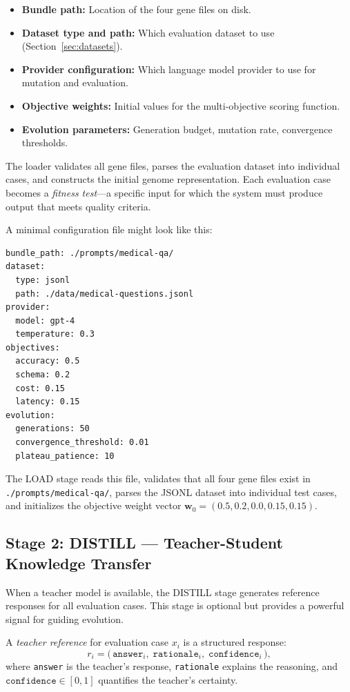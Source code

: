\begin{itemize}[leftmargin=1.5em]
  \item \textbf{Bundle path:} Location of the four gene files on disk.
  \item \textbf{Dataset type and path:} Which evaluation dataset to use (Section~\ref{sec:datasets}).
  \item \textbf{Provider configuration:} Which language model provider to use for mutation and evaluation.
  \item \textbf{Objective weights:} Initial values for the multi-objective scoring function.
  \item \textbf{Evolution parameters:} Generation budget, mutation rate, convergence thresholds.
\end{itemize}

The loader validates all gene files, parses the evaluation dataset into individual cases, and constructs the initial genome representation. Each evaluation case becomes a \emph{fitness test}---a specific input for which the system must produce output that meets quality criteria.

\begin{example}
A minimal configuration file might look like this:
\begin{verbatim}
bundle_path: ./prompts/medical-qa/
dataset:
  type: jsonl
  path: ./data/medical-questions.jsonl
provider:
  model: gpt-4
  temperature: 0.3
objectives:
  accuracy: 0.5
  schema: 0.2
  cost: 0.15
  latency: 0.15
evolution:
  generations: 50
  convergence_threshold: 0.01
  plateau_patience: 10
\end{verbatim}
The LOAD stage reads this file, validates that all four gene files exist in \texttt{./prompts/medical-qa/}, parses the JSONL dataset into individual test cases, and initializes the objective weight vector $\mathbf{w}_0 = (0.5, 0.2, 0.0, 0.15, 0.15)$.
\end{example}

\subsection{Stage 2: DISTILL --- Teacher-Student Knowledge Transfer}
\label{sec:distill-stage}

When a teacher model is available, the DISTILL stage generates reference responses for all evaluation cases. This stage is optional but provides a powerful signal for guiding evolution.

\begin{dogmadef}
A \emph{teacher reference} for evaluation case $x_i$ is a structured response:
\begin{equation}
r_i = \bigl(\, \texttt{answer}_i,\; \texttt{rationale}_i,\; \texttt{confidence}_i \,\bigr),
\end{equation}
where \texttt{answer} is the teacher's response, \texttt{rationale} explains the reasoning, and $\texttt{confidence} \in [0, 1]$ quantifies the teacher's certainty.
\end{dogmadef}

